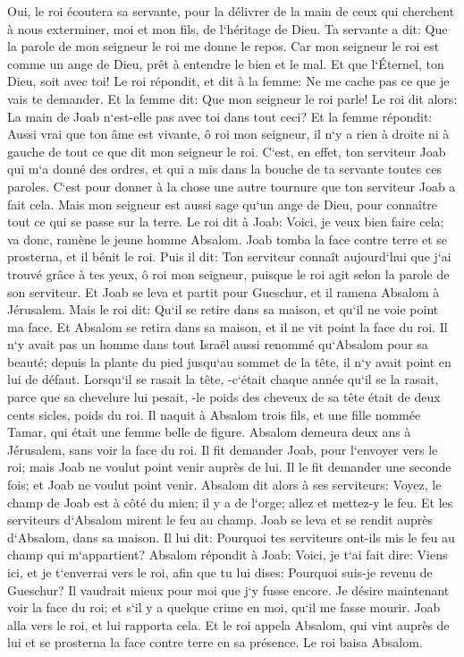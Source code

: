 \verse Oui, le roi écoutera sa servante, pour la délivrer de la main de ceux qui cherchent à nous exterminer, moi et mon fils, de l`héritage de Dieu. 
\verse Ta servante a dit: Que la parole de mon seigneur le roi me donne le repos. Car mon seigneur le roi est comme un ange de Dieu, prêt à entendre le bien et le mal. Et que l`Éternel, ton Dieu, soit avec toi! 
\verse Le roi répondit, et dit à la femme: Ne me cache pas ce que je vais te demander. Et la femme dit: Que mon seigneur le roi parle! 
\verse Le roi dit alors: La main de Joab n`est-elle pas avec toi dans tout ceci? Et la femme répondit: Aussi vrai que ton âme est vivante, ô roi mon seigneur, il n`y a rien à droite ni à gauche de tout ce que dit mon seigneur le roi. C`est, en effet, ton serviteur Joab qui m`a donné des ordres, et qui a mis dans la bouche de ta servante toutes ces paroles. 
\verse C`est pour donner à la chose une autre tournure que ton serviteur Joab a fait cela. Mais mon seigneur est aussi sage qu`un ange de Dieu, pour connaître tout ce qui se passe sur la terre. 
\verse Le roi dit à Joab: Voici, je veux bien faire cela; va donc, ramène le jeune homme Absalom. 
\verse Joab tomba la face contre terre et se prosterna, et il bénit le roi. Puis il dit: Ton serviteur connaît aujourd`hui que j`ai trouvé grâce à tes yeux, ô roi mon seigneur, puisque le roi agit selon la parole de son serviteur. 
\verse Et Joab se leva et partit pour Gueschur, et il ramena Absalom à Jérusalem. 
\verse Mais le roi dit: Qu`il se retire dans sa maison, et qu`il ne voie point ma face. Et Absalom se retira dans sa maison, et il ne vit point la face du roi. 
\verse Il n`y avait pas un homme dans tout Israël aussi renommé qu`Absalom pour sa beauté; depuis la plante du pied jusqu`au sommet de la tête, il n`y avait point en lui de défaut. 
\verse Lorsqu`il se rasait la tête, -c`était chaque année qu`il se la rasait, parce que sa chevelure lui pesait, -le poids des cheveux de sa tête était de deux cents sicles, poids du roi. 
\verse Il naquit à Absalom trois fils, et une fille nommée Tamar, qui était une femme belle de figure. 
\verse Absalom demeura deux ans à Jérusalem, sans voir la face du roi. 
\verse Il fit demander Joab, pour l`envoyer vers le roi; mais Joab ne voulut point venir auprès de lui. Il le fit demander une seconde fois; et Joab ne voulut point venir. 
\verse Absalom dit alors à ses serviteurs: Voyez, le champ de Joab est à côté du mien; il y a de l`orge; allez et mettez-y le feu. Et les serviteurs d`Absalom mirent le feu au champ. 
\verse Joab se leva et se rendit auprès d`Absalom, dans sa maison. Il lui dit: Pourquoi tes serviteurs ont-ils mis le feu au champ qui m`appartient? 
\verse Absalom répondit à Joab: Voici, je t`ai fait dire: Viens ici, et je t`enverrai vers le roi, afin que tu lui dises: Pourquoi suis-je revenu de Gueschur? Il vaudrait mieux pour moi que j`y fusse encore. Je désire maintenant voir la face du roi; et s`il y a quelque crime en moi, qu`il me fasse mourir. 
\verse Joab alla vers le roi, et lui rapporta cela. Et le roi appela Absalom, qui vint auprès de lui et se prosterna la face contre terre en sa présence. Le roi baisa Absalom. 


